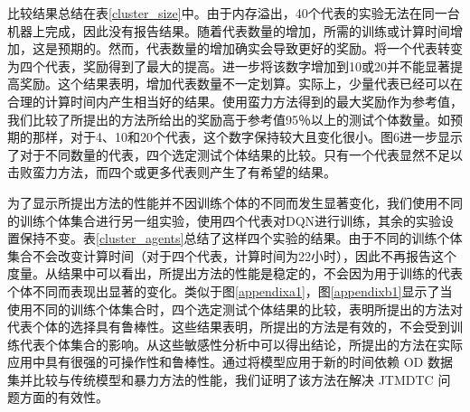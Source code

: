 比较结果总结在表\ref{cluster_size}中。由于内存溢出，40个代表的实验无法在同一台机器上完成，因此没有报告结果。随着代表数量的增加，所需的训练或计算时间增加，这是预期的。然而，代表数量的增加确实会导致更好的奖励。将一个代表转变为四个代表，奖励得到了最大的提高。进一步将该数字增加到10或20并不能显著提高奖励。这个结果表明，增加代表数量不一定划算。实际上，少量代表已经可以在合理的计算时间内产生相当好的结果。使用蛮力方法得到的最大奖励作为参考值，我们比较了所提出的方法所给出的奖励高于参考值95％以上的测试个体数量。如预期的那样，对于4、10和20个代表，这个数字保持较大且变化很小。图6进一步显示了对于不同数量的代表，四个选定测试个体结果的比较。只有一个代表显然不足以击败蛮力方法，而四个或更多代表则产生了有希望的结果。

为了显示所提出方法的性能并不因训练个体的不同而发生显著变化，我们使用不同的训练个体集合进行另一组实验，使用四个代表对DQN进行训练，其余的实验设置保持不变。表\ref{cluster_agents}总结了这样四个实验的结果。由于不同的训练个体集合不会改变计算时间（对于四个代表，计算时间为22小时），因此不再报告这个度量。从结果中可以看出，所提出方法的性能是稳定的，不会因为用于训练的代表个体不同而表现出显著的变化。类似于图\ref{appendixa1}，图\ref{appendixb1}显示了当使用不同的训练个体集合时，四个选定测试个体结果的比较，表明所提出的方法对代表个体的选择具有鲁棒性。这些结果表明，所提出的方法是有效的，不会受到训练代表个体集合的影响。从这些敏感性分析中可以得出结论，所提出的方法在实际应用中具有很强的可操作性和鲁棒性。通过将模型应用于新的时间依赖 OD 数据集并比较与传统模型和暴力方法的性能，我们证明了该方法在解决 JTMDTC 问题方面的有效性。
